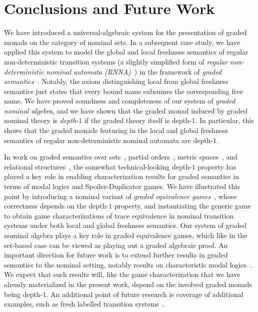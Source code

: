\documentclass[11pt,a4paper]{amsart}
\theoremstyle{plain}
\numberwithin{equation}{section}
\newcommand{\+}[1]{\mathcal{#1}\xspace}
\theoremstyle{definition}
\begin{document}
\section{Conclusions and Future Work}

\noindent We have introduced a universal-algebraic system for the
presentation of graded monads on the category of nominal sets. In a
subsequent case study, we have applied this system to model the global
and local freshness semantics of regular non-deterministic transition
systems (a slightly simplified form of \emph{regular non-deterministic
  nominal automata (RNNA)}~\cite{SchroderEA17}) in the framework of
\emph{graded semantics}~\cite{MiliusEA15,DorschEA19}. Notably, the
axiom distinguishing local from global freshness semantics just states
that every bound name subsumes the corresponding free name. %
We have proved soundness and completeness of our system of
\emph{graded nominal algebra}, and we have shown that the graded monad
induced by graded nominal theory is \emph{depth-$1$} if the graded
theory itself is depth-$1$. In particular, this shows that the graded
monads featuring in the local and global freshness semantics of
regular non-deterministic nominal automata are depth-$1$.

In work on graded semantics over
sets~\cite{MiliusEA15,DorschEA19,FordEA22}, partial
orders~\cite{FordEA21}, metric spaces~\cite{ForsterEA25a}, and
relational structures~\cite{ForsterEA25b}, the somewhat
technical-looking depth-$1$ property has played a key role in enabling
characterization results for graded semantics in terms of modal logics
and Spoiler-Duplicator games. We have illustrated this point by
introducing a nominal variant of \emph{graded equivalence
  games}~\cite{FordEA22}, whose correctness depends on the depth-$1$
property, and instantiating the generic game to obtain game
characterizations of trace equivalence in nominal transition systems
under both local and global freshness semantics. Our system of graded
nominal algebra plays a key role in graded equivalence games, which
like in the set-based case can be viewed as playing out a graded
algebraic proof. An important direction for future work is to extend
further results in graded semantics to the nominal setting, notably
results on characteristic modal
logics~\cite{MiliusEA15,DorschEA19}. We expect that such results will,
like the game characterization that we have already materialized in
the present work, depend on the involved graded monads being
\mbox{depth-$1$}. An additional point of future research is coverage
of additional examples, such as fresh labelled transition
systems~\cite{BandukaraTzevelekos25}.
\end{document}
